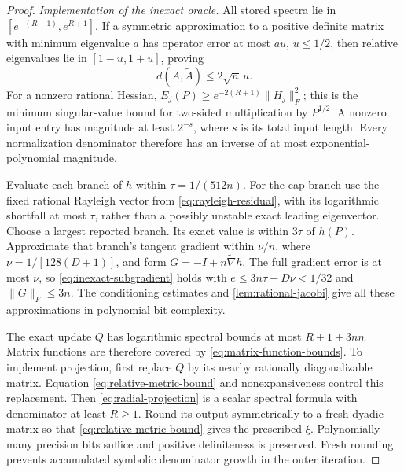 \begin{proof}
\emph{Implementation of the inexact oracle.} All stored spectra lie in
$[e^{-(R+1)},e^{R+1}]$. If a symmetric approximation to a positive definite
matrix with minimum eigenvalue $a$ has operator error at most $au$,
$u\le1/2$, then relative eigenvalues lie in $[1-u,1+u]$, proving
\begin{equation}\label{eq:relative-metric-bound}
 d(A,\widetilde A)\le2\sqrt n\,u.
\end{equation}
For a nonzero rational Hessian,
$E_j(P)\ge e^{-2(R+1)}\|H_j\|_F^2$; this is the minimum singular-value
bound for two-sided multiplication by $P^{1/2}$. A nonzero input entry
has magnitude at least $2^{-s}$, where $s$ is its total input length.
Every normalization denominator therefore has an inverse of at most
exponential-polynomial magnitude.

Evaluate each branch of $h$ within $\tau=1/(512n)$. For the cap branch
use the fixed rational Rayleigh vector from \eqref{eq:rayleigh-residual},
with its logarithmic shortfall at most $\tau$, rather than a possibly
unstable exact leading eigenvector. Choose a largest reported branch.
Its exact value is within $3\tau$ of $h(P)$. Approximate that branch's
tangent gradient within $\nu/n$, where $\nu=1/[128(D+1)]$, and form
$G=-I+n\widetilde\nabla h$. The full gradient error is at most $\nu$,
so \eqref{eq:inexact-subgradient} holds with
$e\le3n\tau+D\nu<1/32$ and $\|G\|_F\le3n$.
The conditioning estimates and \cref{lem:rational-jacobi} give all these
approximations in polynomial bit complexity.

The exact update $Q$ has logarithmic spectral bounds at most
$R+1+3n\eta$. Matrix functions are therefore covered by
\eqref{eq:matrix-function-bounds}. To implement projection, first replace
$Q$ by its nearby rationally diagonalizable matrix. Equation
\eqref{eq:relative-metric-bound} and nonexpansiveness control this
replacement. Then \eqref{eq:radial-projection} is a scalar spectral
formula with denominator at least $R\ge1$. Round its output symmetrically
to a fresh dyadic matrix so that \eqref{eq:relative-metric-bound} gives
the prescribed $\xi$. Polynomially many precision bits suffice and
positive definiteness is preserved. Fresh rounding prevents accumulated
symbolic denominator growth in the outer iteration.


\end{proof}
